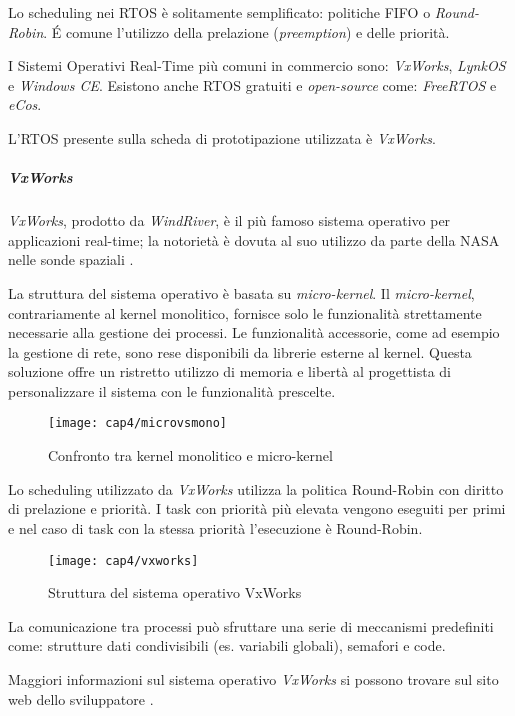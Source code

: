Lo scheduling nei RTOS è solitamente semplificato: politiche FIFO o \textit{Round-Robin}. \'E comune l'utilizzo della prelazione (\textit{preemption}) e delle priorità.

I Sistemi Operativi Real-Time più comuni in commercio sono: \textit{VxWorks}, \textit{LynkOS} e \textit{Windows CE}. Esistono anche RTOS gratuiti e \textit{open-source} come: \textit{FreeRTOS} e \textit{eCos}.

L'RTOS presente sulla scheda di prototipazione utilizzata è \textit{VxWorks}.


\subparagraph{VxWorks}
\textit{VxWorks}, prodotto da \textit{WindRiver}, è il più famoso sistema operativo per applicazioni real-time; la notorietà è dovuta al suo utilizzo da parte della NASA nelle sonde spaziali \cite{fornacia}.

La struttura del sistema operativo è basata su \textit{micro-kernel}. Il \textit{micro-kernel}, contrariamente al kernel monolitico, fornisce solo le funzionalità strettamente necessarie alla gestione dei processi. Le funzionalità accessorie, come ad esempio la gestione di rete, sono rese disponibili da librerie esterne al kernel. Questa soluzione offre un ristretto utilizzo di memoria e libertà al progettista di personalizzare il sistema con le funzionalità prescelte.

\begin{figure}[H]  
  \begin{center}
    \texttt{[image: cap4/microvsmono]}
    \caption{Confronto tra kernel monolitico e micro-kernel}
  \end{center}
\end{figure}

Lo scheduling utilizzato da \textit{VxWorks} utilizza la politica Round-Robin con diritto di prelazione e priorità. I task con priorità più elevata vengono eseguiti per primi e nel caso di task con la stessa priorità l'esecuzione è Round-Robin.
\begin{figure}[H]  
  \begin{center}
    \texttt{[image: cap4/vxworks]}
    \caption{Struttura del sistema operativo VxWorks}
  \end{center}
\end{figure}

La comunicazione tra processi può sfruttare una serie di meccanismi predefiniti come: strutture dati condivisibili (es. variabili globali), semafori e code.

Maggiori informazioni sul sistema operativo \textit{VxWorks} si possono trovare sul sito web dello sviluppatore \cite{sitevxworks}.


